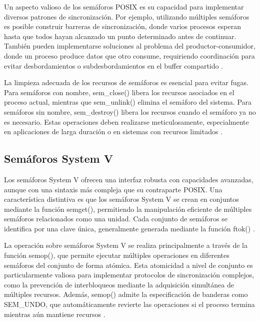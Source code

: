 {Un aspecto valioso de los semáforos POSIX es su capacidad para implementar diversos patrones de sincronización. Por ejemplo, utilizando múltiples semáforos es posible construir barreras de sincronización, donde varios procesos esperan hasta que todos hayan alcanzado un punto determinado antes de continuar. También pueden implementarse soluciones al problema del productor-consumidor, donde un proceso produce datos que otro consume, requiriendo coordinación para evitar desbordamientos o subdesbordamientos en el buffer compartido \cite{love2013linux}.
\vspace{10pt}

La limpieza adecuada de los recursos de semáforos es esencial para evitar fugas. Para semáforos con nombre, sem\_close() libera los recursos asociados en el proceso actual, mientras que sem\_unlink() elimina el semáforo del sistema. Para semáforos sin nombre, sem\_destroy() libera los recursos cuando el semáforo ya no es necesario. Estas operaciones deben realizarse meticulosamente, especialmente en aplicaciones de larga duración o en sistemas con recursos limitados \cite{kerrisk2010linux}.

\subsection{Semáforos System V}

Los semáforos System V ofrecen una interfaz robusta con capacidades avanzadas, aunque con una sintaxis más compleja que su contraparte POSIX. Una característica distintiva es que los semáforos System V se crean en conjuntos mediante la función semget(), permitiendo la manipulación eficiente de múltiples semáforos relacionados como una unidad. Cada conjunto de semáforos se identifica por una clave única, generalmente generada mediante la función ftok() \cite{stevens2013advanced}.
\vspace{10pt}

La operación sobre semáforos System V se realiza principalmente a través de la función semop(), que permite ejecutar múltiples operaciones en diferentes semáforos del conjunto de forma atómica. Esta atomicidad a nivel de conjunto es particularmente valiosa para implementar protocolos de sincronización complejos, como la prevención de interbloqueos mediante la adquisición simultánea de múltiples recursos. Además, semop() admite la especificación de banderas como SEM\_UNDO, que automáticamente revierte las operaciones si el proceso termina mientras aún mantiene recursos \cite{robbins2003unix}.
\vspace{10pt}

}
